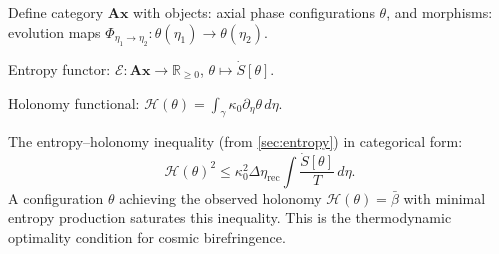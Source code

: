 \documentclass[12pt]{article}
\theoremstyle{definition}
\newcommand{\Wrec}{\Delta\eta_{\mathrm{rec}}}
\begin{document}
Define category $\mathbf{Ax}$ with objects: axial phase configurations
$\theta$, and morphisms: evolution maps
$\Phi_{\eta_1\to\eta_2}:\theta(\eta_1)\to\theta(\eta_2)$.

Entropy functor: $\mathcal{E}:\mathbf{Ax}\to\mathbb{R}_{\geq0}$,
$\theta\mapsto\dot{S}[\theta]$.

Holonomy functional: $\mathcal{H}(\theta)=\int_\gamma\kappa_0\partial_\eta\theta\,d\eta$.

The entropy--holonomy inequality (from \cref{sec:entropy}) in categorical form:
\begin{equation}
  \mathcal{H}(\theta)^2
  \leq\kappa_0^2\Wrec\int\frac{\dot{S}[\theta]}{T}\,d\eta.
\end{equation}
A configuration $\theta$ achieving the observed holonomy
$\mathcal{H}(\theta)=\bar\beta$ with minimal entropy production
saturates this inequality.
This is the thermodynamic optimality condition for cosmic birefringence.
\end{document}
